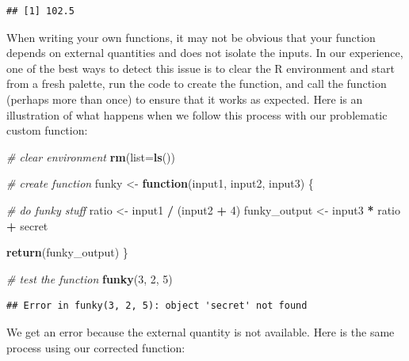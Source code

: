 \documentclass[
]{book}
\newenvironment{Shaded}{\begin{snugshade}}{\end{snugshade}}
\newcommand{\AttributeTok}[1]{\textcolor[rgb]{0.13,0.29,0.53}{#1}}
\newcommand{\CommentTok}[1]{\textcolor[rgb]{0.56,0.35,0.01}{\textit{#1}}}
\newcommand{\ControlFlowTok}[1]{\textcolor[rgb]{0.13,0.29,0.53}{\textbf{#1}}}
\newcommand{\DecValTok}[1]{\textcolor[rgb]{0.00,0.00,0.81}{#1}}
\newcommand{\FunctionTok}[1]{\textcolor[rgb]{0.13,0.29,0.53}{\textbf{#1}}}
\newcommand{\NormalTok}[1]{#1}
\newcommand{\OtherTok}[1]{\textcolor[rgb]{0.56,0.35,0.01}{#1}}
\newcommand{\SpecialCharTok}[1]{\textcolor[rgb]{0.81,0.36,0.00}{\textbf{#1}}}
\begin{document}
\begin{verbatim}
## [1] 102.5
\end{verbatim}

When writing your own functions, it may not be obvious that your function depends on external quantities and does not isolate the inputs.
In our experience, one of the best ways to detect this issue is to clear the R environment and start from a fresh palette, run the code to create the function, and call the function (perhaps more than once) to ensure that it works as expected.
Here is an illustration of what happens when we follow this process with our problematic custom function:

\begin{Shaded}
\begin{Highlighting}[]
\CommentTok{\# clear environment}
\FunctionTok{rm}\NormalTok{(}\AttributeTok{list=}\FunctionTok{ls}\NormalTok{()) }

\CommentTok{\# create function}
\NormalTok{funky }\OtherTok{\textless{}{-}} \ControlFlowTok{function}\NormalTok{(input1, input2, input3) \{}
  
  \CommentTok{\# do funky stuff}
\NormalTok{  ratio }\OtherTok{\textless{}{-}}\NormalTok{ input1 }\SpecialCharTok{/}\NormalTok{ (input2 }\SpecialCharTok{+} \DecValTok{4}\NormalTok{)}
\NormalTok{  funky\_output }\OtherTok{\textless{}{-}}\NormalTok{ input3 }\SpecialCharTok{*}\NormalTok{ ratio }\SpecialCharTok{+}\NormalTok{ secret}
  
  \FunctionTok{return}\NormalTok{(funky\_output)  }
\NormalTok{\}}

\CommentTok{\# test the function}
\FunctionTok{funky}\NormalTok{(}\DecValTok{3}\NormalTok{, }\DecValTok{2}\NormalTok{, }\DecValTok{5}\NormalTok{)}
\end{Highlighting}
\end{Shaded}

\begin{verbatim}
## Error in funky(3, 2, 5): object 'secret' not found
\end{verbatim}

We get an error because the external quantity is not available.
Here is the same process using our corrected function:
\end{document}
